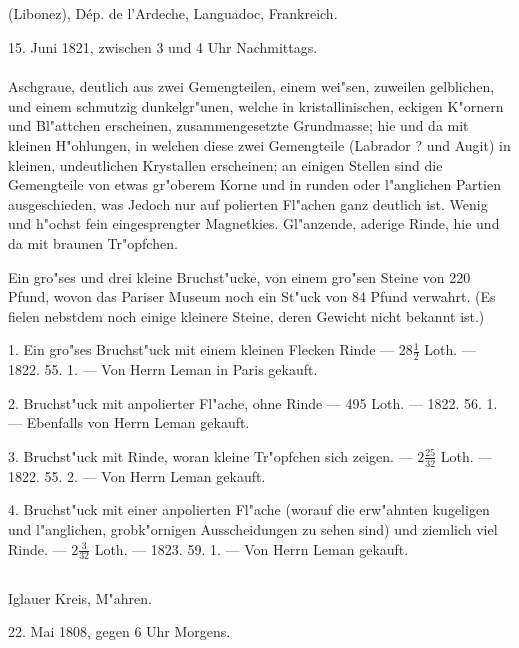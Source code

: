 \documentclass[a4paper, 11pt, oneside, polutonikogreek, german]{article}
\begin{document}
\subsection{}
\begin{center}
(Libonez), Dép. de l'Ardeche, Languadoc, Frankreich.

15. Juni 1821, zwischen 3 und 4 Uhr Nachmittags.
\end{center}
\paragraph{}
Aschgraue, deutlich aus zwei Gemengteilen, einem wei"sen, zuweilen gelblichen, und einem schmutzig dunkelgr"unen, welche in kristallinischen, eckigen K"ornern und Bl"attchen erscheinen, zusammengesetzte Grundmasse; hie und da mit kleinen H"ohlungen, in welchen diese zwei Gemengteile (Labrador ? und Augit) in kleinen, undeutlichen Krystallen erscheinen; an einigen Stellen sind die Gemengteile von etwas gr"oberem Korne und in runden oder l"anglichen Partien ausgeschieden, was Jedoch nur auf polierten Fl"achen ganz deutlich ist. Wenig und h"ochst fein eingesprengter Magnetkies. Gl"anzende, aderige Rinde, hie und da mit braunen Tr"opfchen.

Ein gro"ses und drei kleine Bruchst"ucke, von einem gro"sen Steine von 220 Pfund, wovon das Pariser Museum noch ein St"uck von 84 Pfund verwahrt. (Es fielen nebstdem noch einige kleinere Steine, deren Gewicht nicht bekannt ist.)

1. Ein gro"ses Bruchst"uck mit einem kleinen Flecken Rinde --- $28\frac{1}{2}$ Loth. --- 1822. 55. 1. --- Von Herrn Leman in Paris gekauft.

2. Bruchst"uck mit anpolierter Fl"ache, ohne Rinde --- 495 Loth. --- 1822. 56. 1. --- Ebenfalls von Herrn Leman gekauft.

3. Bruchst"uck mit Rinde, woran kleine Tr"opfchen sich zeigen. --- $2\frac{25}{32}$ Loth. --- 1822. 55. 2. --- Von Herrn Leman gekauft.

4. Bruchst"uck mit einer anpolierten Fl"ache (worauf die erw"ahnten kugeligen und l"anglichen, grobk"ornigen Ausscheidungen zu sehen sind) und ziemlich viel Rinde. --- $2\frac{3}{32}$ Loth. --- 1823. 59. 1. --- Von Herrn Leman gekauft.
\subsection{}
\begin{center}
Iglauer Kreis, M"ahren.

22. Mai 1808, gegen 6 Uhr Morgens.
\end{center}
\end{document}
